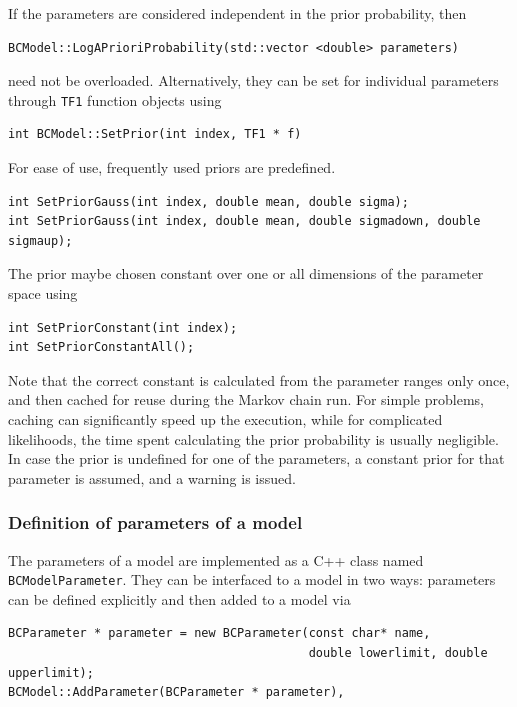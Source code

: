 \documentclass[11pt, a4paper]{article}
\begin{document}
\noindent
If the parameters are considered independent in the prior probability,
then
%
\begin{verbatim}
BCModel::LogAPrioriProbability(std::vector <double> parameters)
\end{verbatim}
%
need not be overloaded.  Alternatively, they can be set for individual
parameters through \verb|TF1| function objects using
%
\begin{verbatim}
int BCModel::SetPrior(int index, TF1 * f)
\end{verbatim}
%
For ease of use, frequently used priors are predefined.
%
\begin{verbatim}
int SetPriorGauss(int index, double mean, double sigma);
int SetPriorGauss(int index, double mean, double sigmadown, double sigmaup);
\end{verbatim}
%
The prior maybe chosen constant over one or all dimensions of the
parameter space using
%
\begin{verbatim}
int SetPriorConstant(int index);
int SetPriorConstantAll();
\end{verbatim}
%
Note that the correct constant is calculated from the parameter ranges
only once, and then cached for reuse during the Markov chain run. For
simple problems, caching can significantly speed up the execution,
while for complicated likelihoods, the time spent calculating the
prior probability is usually negligible. \\

\noindent 
In case the prior is undefined for one of the parameters, a constant
prior for that parameter is assumed, and a warning is issued.


\subsubsection{Definition of parameters of a model}
\label{subsubsection:parameters}

The parameters of a model are implemented as a C++ class named
\verb|BCModelParameter|. They can be interfaced to a model in two
ways: parameters can be defined explicitly and then added to a model
via
%
\begin{verbatim}
BCParameter * parameter = new BCParameter(const char* name,
                                          double lowerlimit, double upperlimit);
BCModel::AddParameter(BCParameter * parameter),
\end{verbatim}
\end{document}
